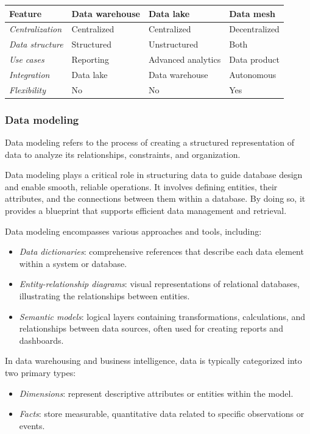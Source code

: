 \renewcommand{\arraystretch}{1.5}
\begin{table}[!ht]
    \centering

    \begin{tabular}{|l|p{4cm}|p{4cm}|p{4cm}|}
        \hline
        \textbf{Feature} & \textbf{Data warehouse} & \textbf{Data lake} & \textbf{Data mesh} \\ \hline
        \textit{Centralization} & Centralized & Centralized & Decentralized \\ \hline
        \textit{Data structure} & Structured & Unstructured & Both \\ \hline
        \textit{Use cases} & Reporting & Advanced analytics & Data product \\ \hline
        \textit{Integration} & Data lake & Data warehouse & Autonomous \\ \hline
        \textit{Flexibility} & No & No & Yes \\ \hline
    \end{tabular}
\end{table}
\renewcommand{\arraystretch}{1}

\subsubsection{Data modeling}
\begin{definition}
    Data modeling refers to the process of creating a structured representation of data to analyze its relationships, constraints, and organization. 
\end{definition}
\noindent Data modeling plays a critical role in structuring data to guide database design and enable smooth, reliable operations. 
It involves defining entities, their attributes, and the connections between them within a database. 
By doing so, it provides a blueprint that supports efficient data management and retrieval.

Data modeling encompasses various approaches and tools, including:
\begin{itemize}
    \item \textit{Data dictionaries}: comprehensive references that describe each data element within a system or database.
    \item \textit{Entity-relationship diagrams}: visual representations of relational databases, illustrating the relationships between entities.
    \item \textit{Semantic models}: logical layers containing transformations, calculations, and relationships between data sources, often used for creating reports and dashboards.
\end{itemize}
\noindent In data warehousing and business intelligence, data is typically categorized into two primary types:
\begin{itemize}
    \item \textit{Dimensions}: represent descriptive attributes or entities within the model.
    \item \textit{Facts}: store measurable, quantitative data related to specific observations or events.
\end{itemize}

